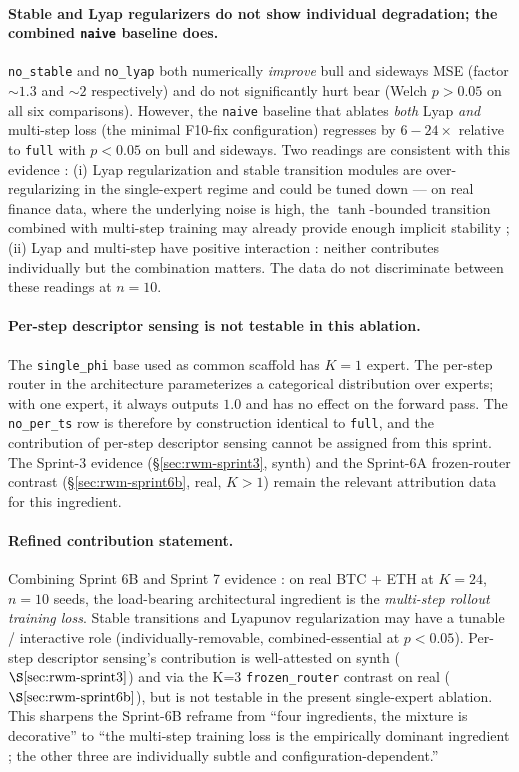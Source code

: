 \documentclass[11pt,a4paper]{article}
\begin{document}
\paragraph{Stable and Lyap regularizers do not show individual
degradation; the combined \texttt{naive} baseline does.}
\texttt{no\_stable} and \texttt{no\_lyap} both numerically
\emph{improve} bull and sideways MSE (factor $\sim 1.3$ and
$\sim 2$ respectively) and do not significantly hurt bear (Welch
$p{>}0.05$ on all six comparisons). However, the \texttt{naive}
baseline that ablates \emph{both} Lyap \emph{and} multi-step
loss (the minimal F10-fix configuration) regresses by $6{-}24\times$
relative to \texttt{full} with $p{<}0.05$ on bull and sideways.
Two readings are consistent with this evidence : (i) Lyap
regularization and stable transition modules are over-regularizing
in the single-expert regime and could be tuned down --- on real
finance data, where the underlying noise is high, the
$\tanh$-bounded transition combined with multi-step training may
already provide enough implicit stability ; (ii) Lyap and
multi-step have positive interaction : neither contributes
individually but the combination matters. The data do not
discriminate between these readings at $n{=}10$.

\paragraph{Per-step descriptor sensing is not testable in this
ablation.} The \texttt{single\_phi} base used as common scaffold
has $K{=}1$ expert. The per-step router in the architecture
parameterizes a categorical distribution over experts; with one
expert, it always outputs $1.0$ and has no effect on the
forward pass. The \texttt{no\_per\_ts} row is therefore by
construction identical to \texttt{full}, and the contribution of
per-step descriptor sensing cannot be assigned from this sprint.
The Sprint-3 evidence (\S\ref{sec:rwm-sprint3}, synth) and
the Sprint-6A frozen-router contrast
(\S\ref{sec:rwm-sprint6b}, real, $K{>}1$) remain the relevant
attribution data for this ingredient.

\paragraph{Refined contribution statement.} Combining Sprint 6B
and Sprint 7 evidence : on real BTC + ETH at $K{=}24$,
$n{=}10$ seeds, the load-bearing architectural ingredient is the
\emph{multi-step rollout training loss}. Stable transitions and
Lyapunov regularization may have a tunable / interactive role
(individually-removable, combined-essential at $p{<}0.05$). Per-step
descriptor sensing's contribution is well-attested on synth
($\S\ref{sec:rwm-sprint3}$) and via the K=3 \texttt{frozen\_router}
contrast on real ($\S\ref{sec:rwm-sprint6b}$), but is not testable
in the present single-expert ablation. This sharpens the Sprint-6B
reframe from ``four ingredients, the mixture is decorative'' to
``the multi-step training loss is the empirically dominant
ingredient ; the other three are individually subtle and
configuration-dependent.''
\end{document}
